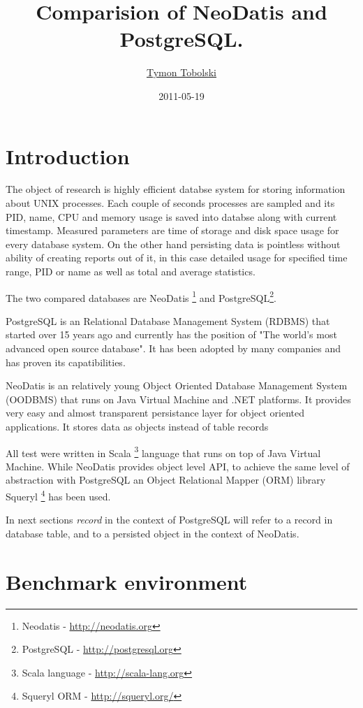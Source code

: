 \documentclass[a4paper,titlepage,12pt]{article}
\title{Comparision of NeoDatis and PostgreSQL.}
\author{\href{mailto:i@teamon.eu}{Tymon Tobolski}}
\date{2011-05-19}
\begin{document}
\maketitle
\tableofcontents

\section{Introduction}\label{sec:introduction}


The object of research is highly efficient databse system for storing information about UNIX processes. Each couple of seconds processes are sampled and its PID, name, CPU and memory usage is saved into databse along with current timestamp. Measured parameters are time of storage and disk space usage for every database system. On the other hand persisting data is pointless without ability of creating reports out of it, in this case detailed usage for specified time range, PID or name as well as total and average statistics.

The two compared databases are NeoDatis \footnote{Neodatis - \url{http://neodatis.org}} and PostgreSQL\footnote{PostgreSQL - \url{http://postgresql.org}}.

PostgreSQL is an Relational Database Management System (RDBMS) that started over 15 years ago and currently has the position of "The world's most advanced open source database". It has been adopted by many companies and has proven its capatibilities.

NeoDatis is an relatively young Object Oriented Database Management System (OODBMS) that runs on Java Virtual Machine and .NET platforms. It provides very easy and almost transparent persistance layer for object oriented applications. It stores data as objects instead of table records

All test were written in Scala \footnote{Scala language - \url{http://scala-lang.org}} language that runs on top of Java Virtual Machine. While NeoDatis provides object level API, to achieve the same level of abstraction with PostgreSQL an Object Relational Mapper (ORM) library Squeryl \footnote{Squeryl ORM - \url{http://squeryl.org/}} has been used.

In next sections \emph{record} in the context of PostgreSQL will refer to a record in database table, and to a persisted object in the context of NeoDatis.


\section{Benchmark environment}\label{sec:tech_info}
\end{document}

